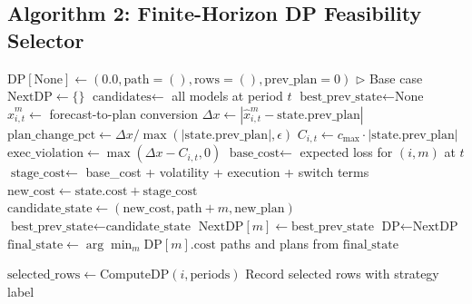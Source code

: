 \subsection{Algorithm 2: Finite-Horizon DP Feasibility Selector}
\label{algo:dp-selector}

\begin{algorithm}[H]
\caption{Deterministic Finite-Horizon DP for Cumulative Loss Minimization}
\label{algo:dp}
\begin{algorithmic}[1]

    \State $\text{DP}[\text{None}] \leftarrow (0.0, \text{path}=(), \text{rows}=(), \text{prev\_plan}=0)$ \quad $\triangleright$ Base case
        \State $\text{NextDP} \leftarrow \{\}$
        \State $\text{candidates} \leftarrow$ all models at period $t$
            \State $\text{best\_prev\_state} \leftarrow \text{None}$
                \State $\hat{x}_{i,t}^{m} \leftarrow$ forecast-to-plan conversion
                \State $\Delta x \leftarrow |\hat{x}_{i,t}^{m} - \text{state.prev\_plan}|$
                \State $\text{plan\_change\_pct} \leftarrow \Delta x / \max(|\text{state.prev\_plan}|, \epsilon)$
                \State $C_{i,t} \leftarrow c_{\max} \cdot |\text{state.prev\_plan}|$
                \State $\text{exec\_violation} \leftarrow \max(\Delta x - C_{i,t}, 0)$
                \State $\text{base\_cost} \leftarrow$ expected loss for $(i, m)$ at $t$
                \State $\text{stage\_cost} \leftarrow$ base\_cost + volatility + execution + switch terms
                \State $\text{new\_cost} \leftarrow \text{state.cost} + \text{stage\_cost}$
                \State $\text{candidate\_state} \leftarrow (\text{new\_cost}, \text{path}+m, \text{new\_plan})$
                    \State $\text{best\_prev\_state} \leftarrow \text{candidate\_state}$
                \EndIf
            \EndFor
                \State $\text{NextDP}[m] \leftarrow \text{best\_prev\_state}$
            \EndIf
        \EndFor
        \State $\text{DP} \leftarrow \text{NextDP}$
    \EndFor
    \State $\text{final\_state} \leftarrow \arg\min_{m} \text{DP}[m].\text{cost}$
    \State \Return paths and plans from $\text{final\_state}$
\EndFunction

    \State $\text{selected\_rows} \leftarrow \text{ComputeDP}(i, \text{periods})$
    \State Record selected rows with strategy label
\EndFor
\end{algorithmic}
\end{algorithm}

